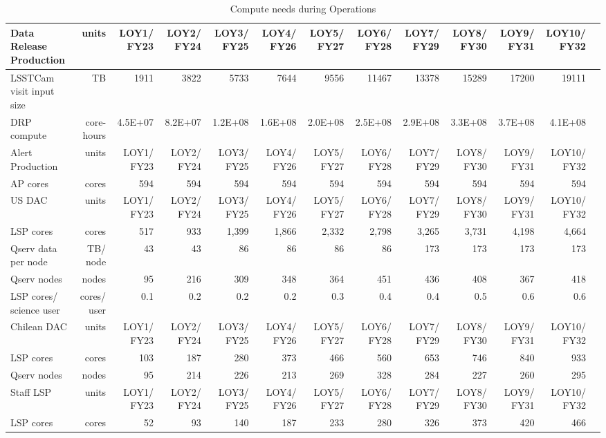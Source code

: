 \tiny \begin{longtable} { |p{}  |r  |r  |r  |r  |r  |r  |r  |r  |r  |r  |r  |r |} 
\caption{Compute needs during Operations \label{tab:computeSizingOps}}\\ 
\hline 
\textbf{Data Release Production}&\textbf{units}&\textbf{LOY1/ FY23}&\textbf{LOY2/ FY24}&\textbf{LOY3/ FY25}&\textbf{LOY4/ FY26}&\textbf{LOY5/ FY27}&\textbf{LOY6/ FY28}&\textbf{LOY7/ FY29}&\textbf{LOY8/ FY30}&\textbf{LOY9/ FY31}&\textbf{LOY10/ FY32} \\ \hline
{LSSTCam visit input size}&{TB}&{1911}&{3822}&{5733}&{7644}&{9556}&{11467}&{13378}&{15289}&{17200}&{19111} \\ \hline
{DRP compute}&{core-hours}&{4.5E+07}&{8.2E+07}&{1.2E+08}&{1.6E+08}&{2.0E+08}&{2.5E+08}&{2.9E+08}&{3.3E+08}&{3.7E+08}&{4.1E+08} \\ \hline
{Alert Production}&{units}&{LOY1/ FY23}&{LOY2/ FY24}&{LOY3/ FY25}&{LOY4/ FY26}&{LOY5/ FY27}&{LOY6/ FY28}&{LOY7/ FY29}&{LOY8/ FY30}&{LOY9/ FY31}&{LOY10/ FY32} \\ \hline
{AP cores}&{cores}&{594}&{594}&{594}&{594}&{594}&{594}&{594}&{594}&{594}&{594} \\ \hline
{US DAC}&{units}&{LOY1/ FY23}&{LOY2/ FY24}&{LOY3/ FY25}&{LOY4/ FY26}&{LOY5/ FY27}&{LOY6/ FY28}&{LOY7/ FY29}&{LOY8/ FY30}&{LOY9/ FY31}&{LOY10/ FY32} \\ \hline
{LSP cores}&{cores}&{517}&{933}&{1,399}&{1,866}&{2,332}&{2,798}&{3,265}&{3,731}&{4,198}&{4,664} \\ \hline
{Qserv data per node}&{TB/ node}&{43}&{43}&{86}&{86}&{86}&{86}&{173}&{173}&{173}&{173} \\ \hline
{Qserv nodes}&{nodes}&{95}&{216}&{309}&{348}&{364}&{451}&{436}&{408}&{367}&{418} \\ \hline
{LSP cores/ science user}&{cores/ user}&{0.1}&{0.2}&{0.2}&{0.2}&{0.3}&{0.4}&{0.4}&{0.5}&{0.6}&{0.6} \\ \hline
{Chilean DAC}&{units}&{LOY1/ FY23}&{LOY2/ FY24}&{LOY3/ FY25}&{LOY4/ FY26}&{LOY5/ FY27}&{LOY6/ FY28}&{LOY7/ FY29}&{LOY8/ FY30}&{LOY9/ FY31}&{LOY10/ FY32} \\ \hline
{LSP cores}&{cores}&{103}&{187}&{280}&{373}&{466}&{560}&{653}&{746}&{840}&{933} \\ \hline
{Qserv nodes}&{nodes}&{95}&{214}&{226}&{213}&{269}&{328}&{284}&{227}&{260}&{295} \\ \hline
{Staff LSP}&{units}&{LOY1/ FY23}&{LOY2/ FY24}&{LOY3/ FY25}&{LOY4/ FY26}&{LOY5/ FY27}&{LOY6/ FY28}&{LOY7/ FY29}&{LOY8/ FY30}&{LOY9/ FY31}&{LOY10/ FY32} \\ \hline
{LSP cores}&{cores}&{52}&{93}&{140}&{187}&{233}&{280}&{326}&{373}&{420}&{466} \\ \hline
\end{longtable} \normalsize
